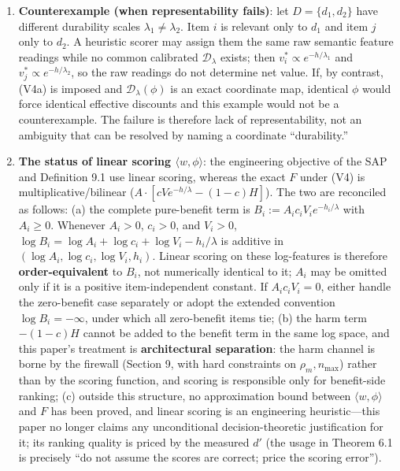 \documentclass[
  11pt]{article}
\begin{document}
\begin{enumerate}
  Independently, even when (V4) holds, two items can share all five
  feature coordinates while \(H_i\ne H_j\); if \(A>0\) and \(c<1\),
  their net values differ by \(-A(1-c)(H_i-H_j)\), which directly
  refutes five-dimensional summariness without (V4b).
\item
  \textbf{Counterexample (when representability fails)}: let
  \(D=\{d_1,d_2\}\) have different durability scales
  \(\lambda_1\ne\lambda_2\). Item \(i\) is relevant only to \(d_1\) and
  item \(j\) only to \(d_2\). A heuristic scorer may assign them the
  same raw semantic feature readings while no common calibrated
  \(\mathcal D_\lambda\) exists; then \(v_i^*\propto e^{-h/\lambda_1}\)
  and \(v_j^*\propto e^{-h/\lambda_2}\), so the raw readings do not
  determine net value. If, by contrast, (V4a) is imposed and
  \(\mathcal D_\lambda(\phi)\) is an exact coordinate map, identical
  \(\phi\) would force identical effective discounts and this example
  would not be a counterexample. The failure is therefore lack of
  representability, not an ambiguity that can be resolved by naming a
  coordinate ``durability.''
\item
  \textbf{The status of linear scoring \(\langle w, \phi\rangle\)}: the
  engineering objective of the SAP and Definition 9.1 use linear
  scoring, whereas the exact \(F\) under (V4) is multiplicative/bilinear
  (\(A \cdot [cVe^{-h/\lambda} - (1-c)H]\)). The two are reconciled as
  follows: (a) the complete pure-benefit term is
  \(B_i:=A_ic_iV_ie^{-h_i/\lambda}\) with \(A_i\ge0\). Whenever
  \(A_i>0\), \(c_i>0\), and \(V_i>0\),
  \(\log B_i=\log A_i+\log c_i+\log V_i-h_i/\lambda\) is additive in
  \((\log A_i,\log c_i,\log V_i,h_i)\). Linear scoring on these
  log-features is therefore \textbf{order-equivalent} to \(B_i\), not
  numerically identical to it; \(A_i\) may be omitted only if it is a
  positive item-independent constant. If \(A_ic_iV_i=0\), either handle
  the zero-benefit case separately or adopt the extended convention
  \(\log B_i=-\infty\), under which all zero-benefit items tie; (b) the
  harm term \(-(1-c)H\) cannot be added to the benefit term in the same
  log space, and this paper's treatment is \textbf{architectural
  separation}: the harm channel is borne by the firewall (Section 9,
  with hard constraints on \(\rho_m, n_{\max}\)) rather than by the
  scoring function, and scoring is responsible only for benefit-side
  ranking; (c) outside this structure, no approximation bound between
  \(\langle w, \phi\rangle\) and \(F\) has been proved, and linear
  scoring is an engineering heuristic---this paper no longer claims any
  unconditional decision-theoretic justification for it; its ranking
  quality is priced by the measured \(d'\) (the usage in Theorem 6.1 is
  precisely ``do not assume the scores are correct; price the scoring
  error'').
\end{enumerate}
\end{document}
